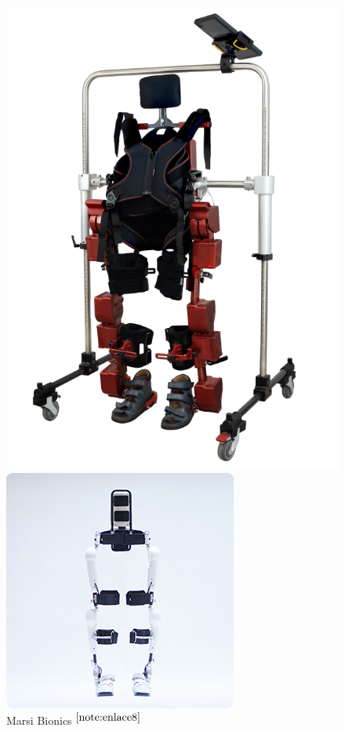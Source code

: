 \begin{figure}[ht!]
\begin{minipage}{0.2\linewidth}
    	\includegraphics[width=\linewidth]{figs/marsi.png}
    	\caption*{\centering Marsi Bionics $^{\ref{note:enlace8}}$}
    \end{minipage}
    \hspace{3cm}
    \begin{minipage}{0.25\linewidth}
    	\centering
    	\includegraphics[width=\linewidth]{figs/cyberdyne.jpg}

\end{minipage}
\end{figure}
